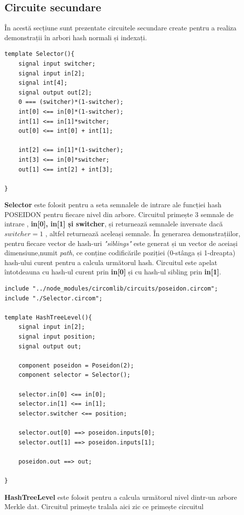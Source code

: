 \documentclass[12pt, letterpaper]{article}
\begin{document}
\subsection{Circuite secundare}
În acestă secțiune sunt prezentate circuitele secundare create pentru a realiza demonstrații în arbori hash normali și indexați.

\begin{lstlisting}[caption="Selector.circom"]
template Selector(){
    signal input switcher;
    signal input in[2];
    signal int[4];
    signal output out[2];
    0 === (switcher)*(1-switcher);
    int[0] <== in[0]*(1-switcher);
    int[1] <== in[1]*switcher;
    out[0] <== int[0] + int[1];

    int[2] <== in[1]*(1-switcher);
    int[3] <== in[0]*switcher;
    out[1] <== int[2] + int[3];

}
\end{lstlisting}

\textbf{Selector} este folosit pentru a seta semnalele de intrare ale funcției hash POSEIDON pentru fiecare nivel din arbore. Circuitul primește 3 semnale de intrare , \textbf{in[0], in[1] și switcher}, și returnează semnalele inversate dacă $switcher=1$ , altfel returnează aceleași semnale. În generarea demonstrațiilor, pentru fiecare vector de hash-uri \emph{"siblings"} este generat și un vector de aceiași dimensiune,numit \emph{path}, ce conține codificările poziției (0-stânga și 1-dreapta) hash-ului curent pentru a calcula următorul hash. Circuitul este apelat întotdeauna cu hash-ul curent prin \textbf{in[0]} și cu hash-ul sibling prin \textbf{in[1]}.


\begin{lstlisting}[caption="HashTreeLevel.circom"]
include "../node_modules/circomlib/circuits/poseidon.circom";
include "./Selector.circom";

template HashTreeLevel(){
    signal input in[2];
    signal input position;
    signal output out;

    component poseidon = Poseidon(2);
    component selector = Selector();

    selector.in[0] <== in[0];
    selector.in[1] <== in[1];
    selector.switcher <== position;

    selector.out[0] ==> poseidon.inputs[0];
    selector.out[1] ==> poseidon.inputs[1];

    poseidon.out ==> out;

}
\end{lstlisting}
\textbf{HashTreeLevel} este folosit pentru a calcula următorul nivel dintr-un arbore Merkle dat. Circuitul primește tralala aici zic ce primește circuitul
\end{document}
